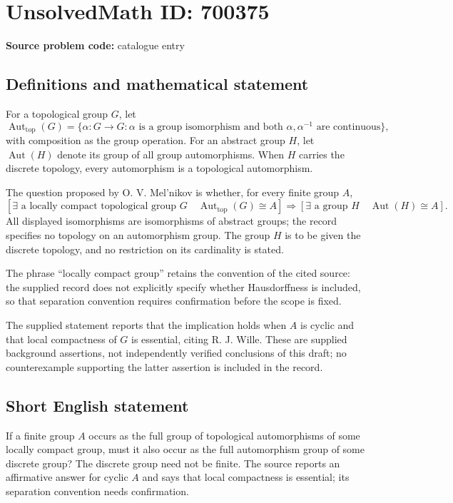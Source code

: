 \documentclass[11pt]{article}
\begin{document}
\section*{UnsolvedMath ID: 700375}
\textbf{Source problem code:} catalogue entry
\subsection{Definitions and mathematical statement}
For a topological group \(G\), let
\[
\operatorname{Aut}_{\mathrm{top}}(G)=\{\alpha:G\to G:\alpha\text{ is a group isomorphism and both }\alpha,\alpha^{-1}\text{ are continuous}\},
\]
with composition as the group operation. For an abstract group \(H\), let \(\operatorname{Aut}(H)\) denote its group of all group automorphisms. When \(H\) carries the discrete topology, every automorphism is a topological automorphism.

The question proposed by O. V. Mel'nikov is whether, for every finite group \(A\),
\[
\left[\exists\text{ a locally compact topological group }G\quad \operatorname{Aut}_{\mathrm{top}}(G)\cong A\right]
\Longrightarrow
\left[\exists\text{ a group }H\quad \operatorname{Aut}(H)\cong A\right].
\]
All displayed isomorphisms are isomorphisms of abstract groups; the record specifies no topology on an automorphism group. The group \(H\) is to be given the discrete topology, and no restriction on its cardinality is stated.

The phrase ``locally compact group'' retains the convention of the cited source: the supplied record does not explicitly specify whether Hausdorffness is included, so that separation convention requires confirmation before the scope is fixed.

The supplied statement reports that the implication holds when \(A\) is cyclic and that local compactness of \(G\) is essential, citing R. J. Wille. These are supplied background assertions, not independently verified conclusions of this draft; no counterexample supporting the latter assertion is included in the record.
\subsection{Short English statement}
If a finite group \(A\) occurs as the full group of topological automorphisms of some locally compact group, must it also occur as the full automorphism group of some discrete group? The discrete group need not be finite. The source reports an affirmative answer for cyclic \(A\) and says that local compactness is essential; its separation convention needs confirmation.
\end{document}
